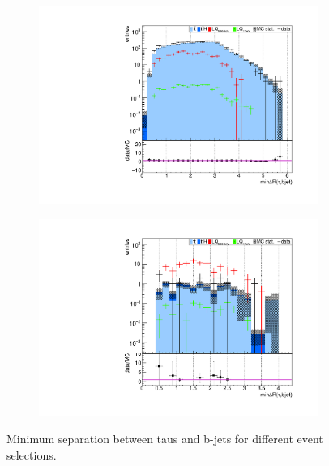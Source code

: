 \begin{figure}
\begin{subfigure}[t]{0.49\textwidth}
                \label{mindR:taubjet:2b2tau}
                \end{subfigure}
                \begin{subfigure}[t]{0.49\textwidth}
                \includegraphics[width=\textwidth]{figures/plots/kinLQ75/mindR_taubjet_2j1b_1tau.pdf}
                \label{mindR:taubjet:1b1tau}
                \end{subfigure}
                \begin{subfigure}[t]{0.49\textwidth}
                \includegraphics[width=\textwidth]{figures/plots/kinLQ75/mindR_taubjet_2j1b_2tau.pdf}
                \label{mindR:taubjet:1b2tau}
                \end{subfigure}
\caption[Minimum separation between taus and b-jets for different event selections.]{Minimum separation between taus and b-jets for different event selections.}
\label{mindR:taubjet}
\end{figure}
